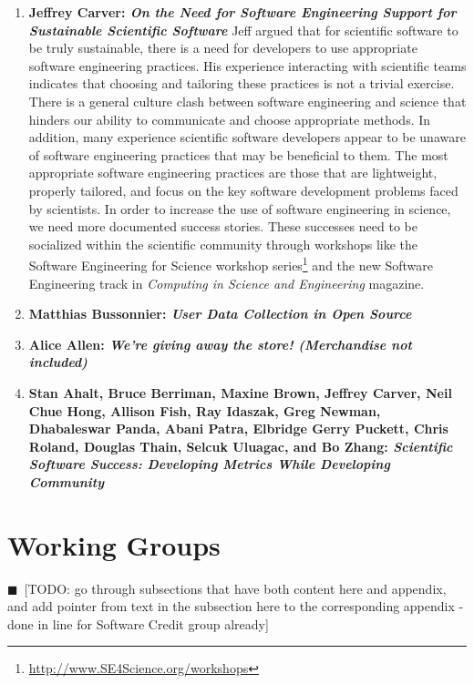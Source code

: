 \documentclass[11pt, oneside]{amsart}
\newcommand{\todo}[1]{{\color{blue}$\blacksquare$~\textsf{[TODO: #1]}}}
\begin{document}
\begin{enumerate}
\item \textbf{Jeffrey Carver: \textit{On the Need for Software Engineering Support for
Sustainable Scientific Software}}
Jeff argued that for scientific software to be truly sustainable, there is a need
for developers to use appropriate software engineering practices. His experience
interacting with scientific teams indicates that choosing and tailoring these
practices is not a trivial exercise. There is a general culture clash between
software engineering and science that hinders our ability to communicate and
choose appropriate methods. In addition, many experience scientific software
developers appear to be unaware of software engineering practices that may be
beneficial to them. The most appropriate software engineering practices are
those that are lightweight, properly tailored, and focus on the key software
development problems faced by scientists. In order to increase the use of
software engineering in science, we need more documented success stories. These
successes need to be socialized within the scientific community through
workshops like the Software Engineering for Science workshop
series\footnote{\href{http://www.SE4Science.org/workshops}{http://www.SE4Science.org/workshops}}
and the new Software Engineering track in
\textit{Computing in Science and Engineering} magazine.

\item \textbf{Matthias Bussonnier: \textit{User Data Collection in Open Source}}

\item \textbf{Alice Allen: \textit{We're giving away the store! (Merchandise not
included)}}

\item \textbf{Stan Ahalt, Bruce Berriman, Maxine Brown, Jeffrey Carver, Neil
Chue Hong, Allison Fish, Ray Idaszak, Greg Newman, Dhabaleswar Panda, Abani
Patra, Elbridge Gerry Puckett, Chris Roland, Douglas Thain, Selcuk Uluagac, and
Bo Zhang: \textit{Scientific Software Success: Developing Metrics While Developing
Community}}

\end{enumerate}

\section{Working Groups} \label{sec:WGs}

\todo{go through subsections that have both content here and appendix, and add pointer from text in the subsection here to the corresponding appendix - done in line for Software Credit group already}
\end{document}
